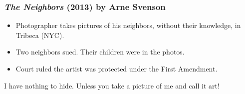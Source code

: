\documentclass{beamer}
\begin{document}










\begin{frame}

\frametitle{\emph{The Neighbors} (2013) by Arne Svenson}

\begin{itemize}
\item Photographer takes pictures of his neighbors, without their
  knowledge,  in Tribeca (NYC).
\item Two neighbors sued.  Their children were in the photos.
\item Court ruled the artist was protected under the First Amendment.


\end{itemize}

\begin{block}{I have nothing to hide.}
    Unless you take a picture of me and call it art!
  \end{block}

\end{frame}
\end{document}
